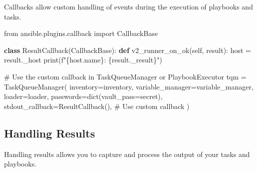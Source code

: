 \documentclass[
  letterpaper,
  DIV=11,
  numbers=noendperiod]{scrreprt}
\newenvironment{Shaded}{\begin{snugshade}}{\end{snugshade}}
\newcommand{\BuiltInTok}[1]{\textcolor[rgb]{0.00,0.23,0.31}{#1}}
\newcommand{\CommentTok}[1]{\textcolor[rgb]{0.37,0.37,0.37}{#1}}
\newcommand{\ImportTok}[1]{\textcolor[rgb]{0.00,0.46,0.62}{#1}}
\newcommand{\KeywordTok}[1]{\textcolor[rgb]{0.00,0.23,0.31}{\textbf{#1}}}
\newcommand{\NormalTok}[1]{\textcolor[rgb]{0.00,0.23,0.31}{#1}}
\newcommand{\OperatorTok}[1]{\textcolor[rgb]{0.37,0.37,0.37}{#1}}
\newcommand{\SpecialCharTok}[1]{\textcolor[rgb]{0.37,0.37,0.37}{#1}}
\newcommand{\SpecialStringTok}[1]{\textcolor[rgb]{0.13,0.47,0.30}{#1}}
\newcommand{\StringTok}[1]{\textcolor[rgb]{0.13,0.47,0.30}{#1}}
\newcommand{\VariableTok}[1]{\textcolor[rgb]{0.07,0.07,0.07}{#1}}
\begin{document}
Callbacks allow custom handling of events during the execution of
playbooks and tasks.

\begin{Shaded}
\begin{Highlighting}[]
\ImportTok{from}\NormalTok{ ansible.plugins.callback }\ImportTok{import}\NormalTok{ CallbackBase}

\KeywordTok{class}\NormalTok{ ResultCallback(CallbackBase):}
    \KeywordTok{def}\NormalTok{ v2\_runner\_on\_ok(}\VariableTok{self}\NormalTok{, result):}
\NormalTok{        host }\OperatorTok{=}\NormalTok{ result.\_host}
        \BuiltInTok{print}\NormalTok{(}\SpecialStringTok{f"}\SpecialCharTok{\{}\NormalTok{host}\SpecialCharTok{.}\NormalTok{name}\SpecialCharTok{\}}\SpecialStringTok{: }\SpecialCharTok{\{}\NormalTok{result}\SpecialCharTok{.}\NormalTok{\_result}\SpecialCharTok{\}}\SpecialStringTok{"}\NormalTok{)}

\CommentTok{\# Use the custom callback in TaskQueueManager or PlaybookExecutor}
\NormalTok{tqm }\OperatorTok{=}\NormalTok{ TaskQueueManager(}
\NormalTok{    inventory}\OperatorTok{=}\NormalTok{inventory,}
\NormalTok{    variable\_manager}\OperatorTok{=}\NormalTok{variable\_manager,}
\NormalTok{    loader}\OperatorTok{=}\NormalTok{loader,}
\NormalTok{    passwords}\OperatorTok{=}\BuiltInTok{dict}\NormalTok{(vault\_pass}\OperatorTok{=}\StringTok{\textquotesingle{}secret\textquotesingle{}}\NormalTok{),}
\NormalTok{    stdout\_callback}\OperatorTok{=}\NormalTok{ResultCallback(),  }\CommentTok{\# Use custom callback}
\NormalTok{)}
\end{Highlighting}
\end{Shaded}

\subsection{Handling Results}\label{handling-results}

Handling results allows you to capture and process the output of your
tasks and playbooks.
\end{document}
